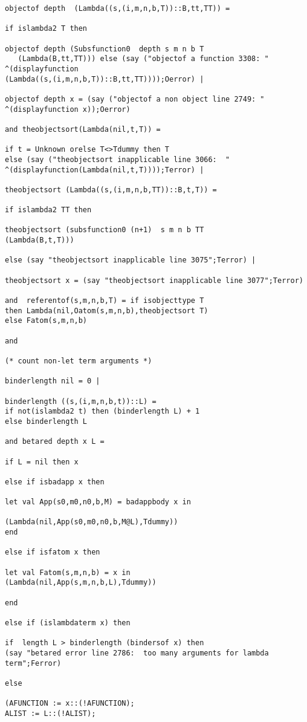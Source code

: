 \documentclass[12pt]{article}
\begin{document}
\begin{verbatim}
objectof depth  (Lambda((s,(i,m,n,b,T))::B,tt,TT)) =

if islambda2 T then 

objectof depth (Subsfunction0  depth s m n b T
   (Lambda(B,tt,TT))) else (say ("objectof a function 3308: "
^(displayfunction 
(Lambda((s,(i,m,n,b,T))::B,tt,TT))));Oerror) |

objectof depth x = (say ("objectof a non object line 2749: "
^(displayfunction x));Oerror)

and theobjectsort(Lambda(nil,t,T)) = 

if t = Unknown orelse T<>Tdummy then T 
else (say ("theobjectsort inapplicable line 3066:  "
^(displayfunction(Lambda(nil,t,T))));Terror) |

theobjectsort (Lambda((s,(i,m,n,b,TT))::B,t,T)) =

if islambda2 TT then 

theobjectsort (subsfunction0 (n+1)  s m n b TT 
(Lambda(B,t,T)))

else (say "theobjectsort inapplicable line 3075";Terror) |

theobjectsort x = (say "theobjectsort inapplicable line 3077";Terror)

and  referentof(s,m,n,b,T) = if isobjecttype T 
then Lambda(nil,Oatom(s,m,n,b),theobjectsort T)
else Fatom(s,m,n,b)

and  

(* count non-let term arguments *)

binderlength nil = 0 |

binderlength ((s,(i,m,n,b,t))::L) =
if not(islambda2 t) then (binderlength L) + 1
else binderlength L

and betared depth x L =

if L = nil then x

else if isbadapp x then

let val App(s0,m0,n0,b,M) = badappbody x in

(Lambda(nil,App(s0,m0,n0,b,M@L),Tdummy)) 
end

else if isfatom x then 

let val Fatom(s,m,n,b) = x in
(Lambda(nil,App(s,m,n,b,L),Tdummy))

end

else if (islambdaterm x) then

if  length L > binderlength (bindersof x) then 
(say "betared error line 2786:  too many arguments for lambda term";Ferror)

else

(AFUNCTION := x::(!AFUNCTION);
ALIST := L::(!ALIST);


\end{verbatim}
\end{document}
